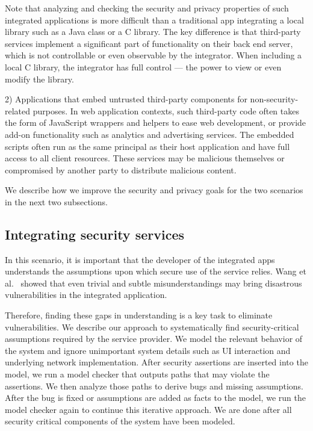 Note that analyzing and checking the security and privacy properties of such integrated applications is more difficult than a traditional app integrating a local library such as a Java class or a C library.  The key difference is that third-party services implement a significant part of functionality on their back end server, which is not controllable or even observable by the integrator.  When including a local C library, the integrator has full control --- the power to view or even modify the library.

2) Applications that embed untrusted third-party components for non-security-related purposes.  In web application contexts, such third-party code often takes the form of JavaScript wrappers and helpers to ease web development, or provide add-on functionality such as analytics and advertising services.  The embedded scripts often run as the same principal as their host application and have full access to all client resources.  These services may be malicious themselves or compromised by another party to distribute malicious content. 

We describe how we improve the security and privacy goals for the two scenarios in the next two subsections.

\subsection{Integrating security services}

In this scenario, it is important that the developer of the integrated apps understands the assumptions upon which secure use of the service relies.  Wang et al.~\cite{Wang:2012:SMY:2310656.2310691,Wang:2011:SFO:2006077.2006782} showed that even trivial and subtle misunderstandings may bring disastrous vulnerabilities in the integrated application.

Therefore, finding these gaps in understanding is a key task to eliminate vulnerabilities.  We describe our approach to systematically find security-critical assumptions required by the service provider.  We model the relevant behavior of the system and ignore unimportant system details such as UI interaction and underlying network implementation.  After security assertions are inserted into the model, we run a model checker that outputs paths that may violate the assertions.  We then analyze those paths to derive bugs and missing assumptions.  After the bug is fixed or assumptions are added as facts to the model, we run the model checker again to continue this iterative approach.  We are done after all security critical components of the system have been modeled.

